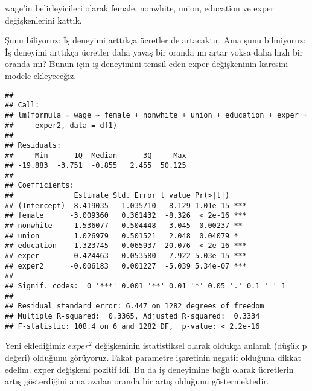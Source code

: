 \documentclass[
]{book}
\newenvironment{Shaded}{\begin{snugshade}}{\end{snugshade}}
\newcommand{\DataTypeTok}[1]{\textcolor[rgb]{0.13,0.29,0.53}{#1}}
\newcommand{\DecValTok}[1]{\textcolor[rgb]{0.00,0.00,0.81}{#1}}
\newcommand{\KeywordTok}[1]{\textcolor[rgb]{0.13,0.29,0.53}{\textbf{#1}}}
\newcommand{\NormalTok}[1]{#1}
\newcommand{\OperatorTok}[1]{\textcolor[rgb]{0.81,0.36,0.00}{\textbf{#1}}}
\newcommand{\StringTok}[1]{\textcolor[rgb]{0.31,0.60,0.02}{#1}}
\begin{document}
wage'in belirleyicileri olarak female, nonwhite, union, education ve exper değişkenlerini kattık.

Şunu biliyoruz: İş deneyimi arttıkça ücretler de artacaktır. Ama şunu bilmiyoruz: İş deneyimi arttıkça ücretler daha yavaş bir oranda mı artar yoksa daha hızlı bir oranda mı? Bunun için iş deneyimini temsil eden exper değişkeninin karesini modele ekleyeceğiz.

\begin{Shaded}
\end{Shaded}

\begin{verbatim}
## 
## Call:
## lm(formula = wage ~ female + nonwhite + union + education + exper + 
##     exper2, data = df1)
## 
## Residuals:
##     Min      1Q  Median      3Q     Max 
## -19.883  -3.751  -0.855   2.455  50.125 
## 
## Coefficients:
##              Estimate Std. Error t value Pr(>|t|)    
## (Intercept) -8.419035   1.035710  -8.129 1.01e-15 ***
## female      -3.009360   0.361432  -8.326  < 2e-16 ***
## nonwhite    -1.536077   0.504448  -3.045  0.00237 ** 
## union        1.026979   0.501521   2.048  0.04079 *  
## education    1.323745   0.065937  20.076  < 2e-16 ***
## exper        0.424463   0.053580   7.922 5.03e-15 ***
## exper2      -0.006183   0.001227  -5.039 5.34e-07 ***
## ---
## Signif. codes:  0 '***' 0.001 '**' 0.01 '*' 0.05 '.' 0.1 ' ' 1
## 
## Residual standard error: 6.447 on 1282 degrees of freedom
## Multiple R-squared:  0.3365, Adjusted R-squared:  0.3334 
## F-statistic: 108.4 on 6 and 1282 DF,  p-value: < 2.2e-16
\end{verbatim}

Yeni eklediğimiz \(exper^2\) değişkeninin istatistiksel olarak oldukça anlamlı (düşük p değeri) olduğunu görüyoruz. Fakat parametre işaretinin negatif olduğuna dikkat edelim. exper değişkeni pozitif idi. Bu da iş deneyimine bağlı olarak ücretlerin artış gösterdiğini ama azalan oranda bir artış olduğunu göstermektedir.
\end{document}

